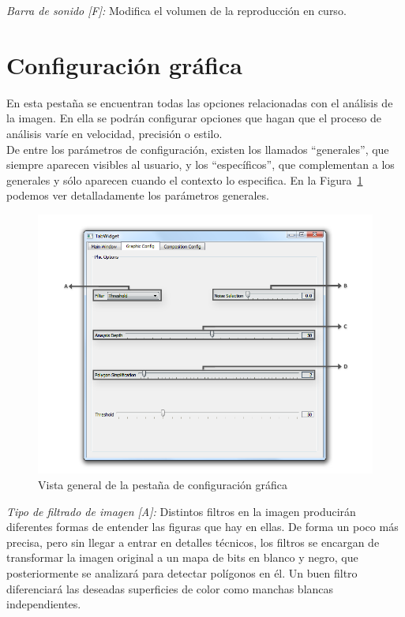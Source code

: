 		\noindent\textit{Barra de sonido [F]:} Modifica el volumen de la reproducción en curso.

		
	\section{Configuración gráfica}
		En esta pestaña se encuentran todas las opciones relacionadas con el análisis de la imagen. En ella se podrán configurar opciones que hagan que el proceso de análisis varíe en velocidad, precisión o estilo.\\
		
		De entre los parámetros de configuración, existen los llamados ``generales'', que siempre aparecen visibles al usuario, y los ``específicos'', que complementan a los generales y sólo aparecen cuando el contexto lo especifica. En la Figura~\ref{fig:interfazgraphic} podemos ver detalladamente los parámetros generales.\\
		
		\begin{figure}[htbp]
		\centering
		\hspace*{-0.45in}
		\includegraphics[scale=0.5]{graphics/interfazgraphic.png}
		\caption{Vista general de la pestaña de configuración gráfica}
		\label{fig:interfazgraphic}
		\end{figure}
		
		\noindent\textit{Tipo de filtrado de imagen [A]:} Distintos filtros en la imagen producirán diferentes formas de entender las figuras que hay en ellas. De forma un poco más precisa, pero sin llegar a entrar en detalles técnicos, los filtros se encargan de transformar la imagen original a un mapa de bits en blanco y negro, que posteriormente se analizará para detectar polígonos en él. Un buen filtro diferenciará las deseadas superficies de color como manchas blancas independientes.\\
		
